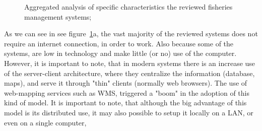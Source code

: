 \documentclass[11pt]{article} %
\begin{document}
\begin{figure}[ht]
\centering
{}
\caption[Aggregated analysis of specific characteristics the reviewed fisheries management systems;]
{Aggregated analysis of specific characteristics the reviewed fisheries management systems;}
\label{analysis2}
\end{figure}

As we can see in see figure~\ref{analysis2}a, the vast majority of the reviewed systems does not require an internet connection, in order to work. Also because some of the systems, are low in technology and make little (or no) use of the computer. However, it is important to note, that in modern systems there is an increase use of the server-client architecture, where they centralize the information (database, maps), and serve it through "thin" clients (normally web browsers). The use of web-mapping services such as WMS, triggered a "boom" in the adoption of this kind of model. It is important to note, that although the big advantage of this model is its distributed use, it may also possible to setup it locally on a LAN, or even on a single computer,
\end{document}
